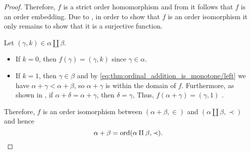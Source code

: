 \begin{proof}
  Therefore, \( f \) is a strict order homomorphism and from  it follows that \( f \) is an order embedding. Due to , in order to show that \( f \) is an order isomorphism it only remains to show that it is a surjective function.

  Let \( (\gamma, k) \in \alpha \amalg \beta \).
  \begin{itemize}
    \item If \( k = 0 \), then \( f(\gamma) = (\gamma, k) \) since \( \gamma \in \alpha \).
    \item If \( k = 1 \), then \( \gamma \in \beta \) and by \eqref{eq:thm:ordinal_addition_is_monotone/left} we have \( \alpha + \gamma < \alpha + \beta \), so \( \alpha + \gamma \) is within the domain of \( f \). Furthermore, as shown in , if \( \alpha + \delta = \alpha + \gamma \), then \( \delta = \gamma \), Thus, \( f(\alpha + \gamma) = (\gamma, 1) \) .
  \end{itemize}

  Therefore, \( f \) is an order isomorphism between \( (\alpha + \beta, \in) \) and \( (\alpha \amalg \beta, \prec) \) and hence
  \begin{equation*}
    \alpha + \beta = \operatorname{ord}(\alpha \amalg \beta, \prec).
  \end{equation*}
\end{proof}

